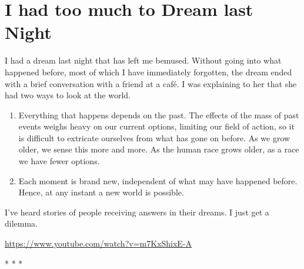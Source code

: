 \section{I had too much to Dream last Night}

I had a dream last night that has left me bemused. Without going into what happened before, most of which I have immediately forgotten, the dream ended with a brief conversation with a friend at a café. I was explaining to her that she had two ways to look at the world.

\begin{enumerate}
\item Everything that happens depends on the past. The effects of the mass of past events weighs heavy on our current options, limiting our field of action, so it is difficult to extricate ourselves from what has gone on before. As we grow older, we sense this more and more. As the human race grows older, as a race we have fewer options.

\item Each moment is brand new, independent of what may have happened before. Hence, at any instant a new world is possible.
\end{enumerate}


I've heard stories of people receiving answers in their dreams. I just get a dilemma.

\url{https://www.youtube.com/watch?v=m7KxShixE-A}


\begin{center}* * *\end{center}

